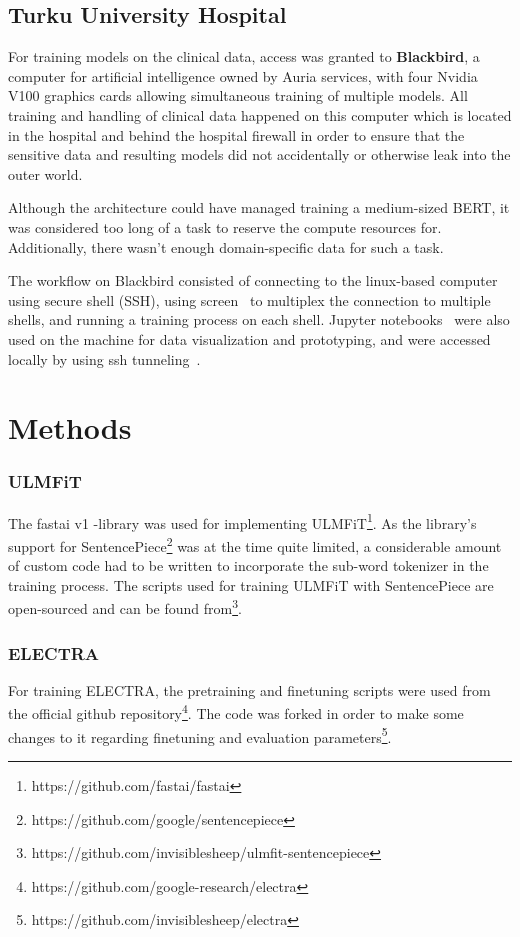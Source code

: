 \subsection{Turku University Hospital} \label{Turku University Hospital}
For training models on the clinical data, access was granted to \textbf{Blackbird}, a computer for artificial intelligence owned by Auria services, with four Nvidia V100 graphics cards allowing simultaneous training of multiple models.
All training and handling of clinical data happened on this computer which is located in the hospital and behind the hospital firewall in order to ensure that the sensitive data and resulting models did not accidentally or otherwise leak into the outer world.


Although the architecture could have managed training a medium-sized BERT, it was considered too long of a task to reserve the compute resources for.
Additionally, there wasn't enough domain-specific data for such a task.


The workflow on Blackbird consisted of connecting to the linux-based computer using secure shell (SSH), using screen~\cite{zotero-180} to multiplex the connection to multiple shells, and running a training process on each shell.
Jupyter notebooks~\cite{zotero-182} were also used on the machine for data visualization and prototyping, and were accessed locally by using ssh tunneling~\cite{zotero-184}.

\section{Methods}\label{Methods}
\subsubsection{ULMFiT}\label{ULMFiT}
The fastai v1 -library was used for implementing ULMFiT\footnote{https://github.com/fastai/fastai}.
As the library's support for SentencePiece\footnote{https://github.com/google/sentencepiece} was at the time quite limited, a considerable amount of custom code had to be written to incorporate the sub-word tokenizer in the training process.
The scripts used for training ULMFiT with SentencePiece are open-sourced and can be found from\footnote{https://github.com/invisiblesheep/ulmfit-sentencepiece}.

\subsubsection{ELECTRA}\label{ELECTRA}
For training ELECTRA, the pretraining and finetuning scripts were used from the official github repository\footnote{https://github.com/google-research/electra}.
The code was forked in order to make some changes to it regarding finetuning and evaluation parameters\footnote{https://github.com/invisiblesheep/electra}.

